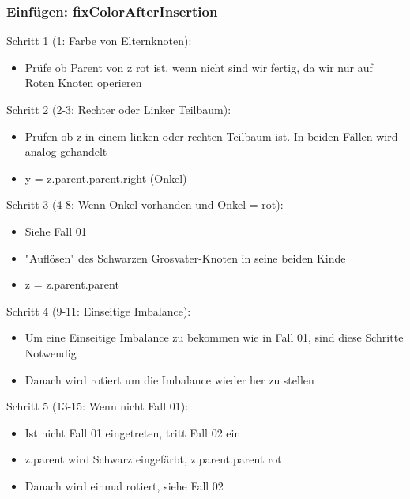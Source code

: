 		
		\subsubsection{Einfügen: fixColorAfterInsertion}
			\begin{minipage}{0.5\textwidth}
					Schritt 1 (1: Farbe von Elternknoten):
					\begin{itemize}
						\item Prüfe ob Parent von z rot ist, wenn nicht sind wir fertig,
							da wir nur auf Roten Knoten operieren \\
					\end{itemize}

					Schritt 2 (2-3: Rechter oder Linker Teilbaum):
					\begin{itemize}
						\item Prüfen ob z in einem linken oder rechten Teilbaum ist. In beiden
							Fällen wird analog gehandelt
						\item y = z.parent.parent.right (Onkel) \\
					\end{itemize}

					Schritt 3 (4-8: Wenn Onkel vorhanden und Onkel = rot):
					\begin{itemize}
						\item Siehe Fall 01
						\item "Auflösen" des Schwarzen Grosvater-Knoten in seine beiden Kinde
						\item z = z.parent.parent \\
					\end{itemize}

					Schritt 4 (9-11: Einseitige Imbalance):
					\begin{itemize}
						\item Um eine Einseitige Imbalance zu bekommen wie in Fall 01, sind diese Schritte Notwendig
						\item Danach wird rotiert um die Imbalance wieder her zu stellen \\
					\end{itemize}

					Schritt 5 (13-15: Wenn nicht Fall 01):
					\begin{itemize}
						\item Ist nicht Fall 01 eingetreten, tritt Fall 02 ein
						\item z.parent wird Schwarz eingefärbt, z.parent.parent rot
						\item Danach wird einmal rotiert, siehe Fall 02
					\end{itemize}
			\end{minipage}

